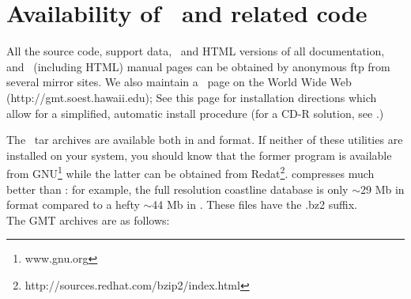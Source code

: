 %
%
\chapter{Availability of \gmt\ and related code}
\thispagestyle{headings}

All the source code, support data, \PS\,
and HTML versions of all documentation, and \UNIX\
(including HTML) manual pages can be obtained by anonymous
ftp from several mirror sites.  We also maintain a \GMT\
page on the World Wide Web (http://gmt.soest.hawaii.edu);
See this page for installation directions 
which allow for a simplified, automatic install procedure
(for a CD-R solution, see .)

The \GMT\ tar archives are available both in \progname{gzip}
and  format.  If neither of these utilities
are installed on your system, you should know that the former
program is available from GNU\footnote{www.gnu.org} while the
latter can be obtained from Redat\footnote{http://sources.redhat.com/bzip2/index.html}.
 compresses much better than :
for example, the full resolution coastline database is only
$\sim$29 Mb in \progname{bzip2} format compared to a hefty
$\sim$44 Mb in \progname{gzip}.  These files have the
.bz2 suffix. \\

The GMT archives are as follows:


